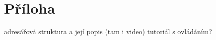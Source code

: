 
%






\chapter{Příloha}
adresářová struktura a její popis (tam i video)
tutoriál s ovládáním?

%
